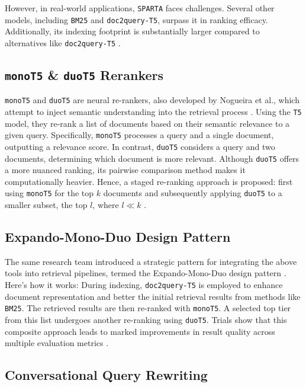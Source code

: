 \documentclass[sigconf]{acmart}
\begin{document}
However, in real-world applications, \texttt{SPARTA} faces challenges. Several other models, including \texttt{BM25} and \texttt{doc2query-T5}, surpass it in ranking efficacy. Additionally, its indexing footprint is substantially larger compared to alternatives like \texttt{doc2query-T5} \cite{thakur2021beir}.

\subsection*{\texttt{monoT5} \& \texttt{duoT5} Rerankers}\label{sec:rerankers}
\texttt{monoT5} and \texttt{duoT5} are neural re-rankers, also developed by Nogueira et al., which attempt to inject semantic understanding into the retrieval process \cite{nogueira2020document,nogueira2019multi}. Using the \texttt{T5} model, they re-rank a list of documents based on their semantic relevance to a given query. Specifically, \texttt{monoT5} processes a query and a single document, outputting a relevance score. In contrast, \texttt{duoT5} considers a query and two documents, determining which document is more relevant. Although \texttt{duoT5} offers a more nuanced ranking, its pairwise comparison method makes it computationally heavier. Hence, a staged re-ranking approach is proposed: first using \texttt{monoT5} for the top $k$ documents and subsequently applying \texttt{duoT5} to a smaller subset, the top $l$, where $l \ll k$ \cite{nogueira2019multi,pradeep2021expando}.


\subsection*{Expando-Mono-Duo Design Pattern}\label{sec:expando}
The same research team introduced a strategic pattern for integrating the above tools into retrieval pipelines, termed the Expando-Mono-Duo design pattern \cite{pradeep2021expando}. Here's how it works: During indexing, \texttt{doc2query-T5} is employed to enhance document representation and better the initial retrieval results from methods like \texttt{BM25}. The retrieved results are then re-ranked with \texttt{monoT5}. A selected top tier from this list undergoes another re-ranking using \texttt{duoT5}. Trials show that this composite approach leads to marked improvements in result quality across multiple evaluation metrics \cite{pradeep2021expando}.

\subsection*{Conversational Query Rewriting}\label{sec:cqr}
\end{document}
